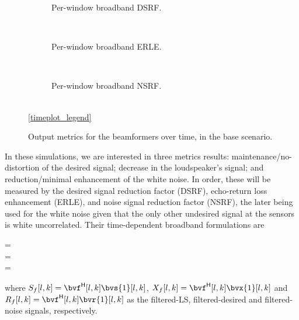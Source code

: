 
\begin{figure}[!t]
	\centering
	\begin{subfigure}{\textwidth}
		\centering
		
		\caption{Per-window broadband DSRF.}
		\label{subfig:lineplot__v7__DSRF_l__iSER_n15__Ly_1__err_0}
	\end{subfigure}\\[1em]
	\begin{subfigure}{\textwidth}
		\centering
		
		\caption{Per-window broadband ERLE.}
		\label{subfig:lineplot__v7__ERLE_l__iSER_n15__Ly_1__err_0}
	\end{subfigure}\\[1em]
	\begin{subfigure}{\textwidth}
		\centering
		
		\caption{Per-window broadband NSRF.}
		\label{subfig:lineplot__v7__NSRF_l__iSER_n15__Ly_1__err_0}
	\end{subfigure}\\[1em]
	\ref*{timeplot_legend}
	\caption{Output metrics for the beamformers over time, in the base scenario.}
	\label{fig:lineplot__v7__iSER_n15__Ly_1__err_0}
\end{figure}

In these simulations, we are interested in three metrics results: maintenance/no-distortion of the desired signal; decrease in the loudspeaker's signal; and reduction/minimal enhancement of the white noise. In order, these will be measured by the desired signal reduction factor (DSRF), echo-return loss enhancement (ERLE), and noise signal reduction factor (NSRF), the later being used for the white noise given that the only other undesired signal at the sensors is white uncorrelated. Their time-dependent broadband formulations are
\begin{subgather}
	\dsrf[l] =  \\
	\erle[l] =  \\
	\nsrf[l] = 
\end{subgather}
where $S_f[l,k] = \he{\bvf}[l,k] \bvs{1}[l,k]$, $X_f[l,k] = \he{\bvf}[l,k] \bvx{1}[l,k]$ and $R_f[l,k] = \he{\bvf}[l,k] \bvr{1}[l,k]$ as the filtered-LS, filtered-desired and filtered-noise signals, respectively.

